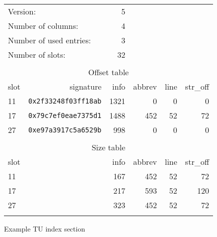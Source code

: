 \begin{figure}[h]
\begin{center}
\begin{tabular}{lrrrrr}
\hline
  \multicolumn{2}{l}{Version:}&                 5 \\
  \multicolumn{2}{l}{Number of columns:}&       4 \\
  \multicolumn{2}{l}{Number of used entries:}&  3 \\
  \multicolumn{2}{l}{Number of slots:}&         32 \\
\\
  \multicolumn{6}{c}{Offset table} \\
  \hline
  slot&  signature&                    info&   abbrev&     line& str\_off \\
  11& \texttt{0x2f33248f03ff18ab}&     1321&        0&        0&        0 \\
  17& \texttt{0x79c7ef0eae7375d1}&     1488&      452&       52&       72 \\
  27& \texttt{0xe97a3917c5a6529b}&      998&        0&        0&        0 \\
\\
  \multicolumn{6}{c}{Size table} \\
  \hline
  slot&                          &     info&   abbrev&     line& str\_off \\
  11&                            &      167&      452&       52&       72 \\
  17&                            &      217&      593&       52&      120 \\
  27&                            &      323&      452&       52&       72 \\
\\
\hline
\end{tabular}
\end{center}
\caption{Example TU index section}
\label{fig:exampletuindexsection}
\end{figure}

